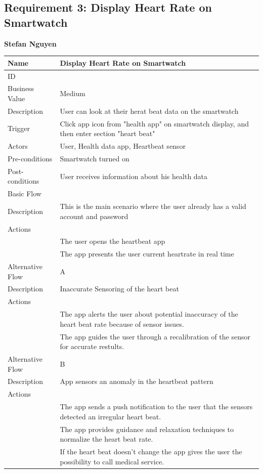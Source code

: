\documentclass{article}
\begin{document}
\subsection{Requirement 3: Display Heart Rate on Smartwatch}
	\textbf{Stefan Nguyen}
	\begin{center}
		\begin{tabularx}{1.0\textwidth}{|>{\raggedright\arraybackslash}p{}|>{\raggedright\arraybackslash}X|}
			\hline
			Name             & Display Heart Rate on Smartwatch \\ \hline
			ID               & 3 \\ \hline
			Business Value   & Medium \\ \hline
			Description      & User can look at their herat beat data on the smartwatch \\ \hline
			Trigger          & Click app icon from "health app" on smartwatch display, and then enter section "heart beat" \\ \hline
			Actors           & User, Health data app, Heartbeat sensor \\ \hline
			Pre-conditions   & Smartwatch turned on \\ \hline
			Post-conditions  & User receives information about his health data \\ \hline
			Basic Flow       & \\ \hline
							Description & This is the main scenario where the user already has a valid account and password \\ \hline
							Actions & \\ \hline
							1 & The user opens the heartbeat app \\ \hline
							2 & The app presents the user current heartrate in real time \\ \hline
			Alternative Flow & A \\ \hline
							Description & Inaccurate Sensoring of the heart beat \\ \hline
							Actions & \\ \hline
							1 & The app alerts the user about potential inaccuracy of the heart beat rate because of sensor issues. \\ \hline
							2 & The app guides the user through a recalibration of the sensor for accurate restults.  \\ \hline
			Alternative Flow & B \\ \hline
							Description & App sensors an anomaly in the heartbeat pattern  \\ \hline
							Actions & \\ \hline
							1 & The app sends a push notification to the user that the sensors detected an irregular heart beat. \\ \hline
							2 & The app provides guidance and relaxation techniques to normalize the heart beat rate. \\ \hline
							3 & If the heart beat doesn't change the app gives the user the possibility to call medical service. \\ \hline
		\end{tabularx}
	\end{center}
\end{document}
